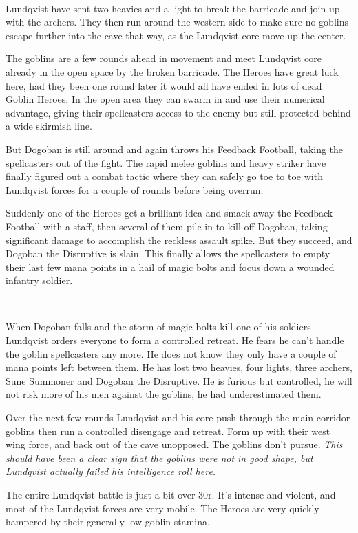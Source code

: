 \

Lundqvist have sent two heavies and a light to break the barricade and join up with the archers. They then run around the western side to make sure no goblins escape further into the cave that way, as the Lundqvist core move up the center. 

The goblins are a few rounds ahead in movement and meet Lundqvist core already in the open space by the broken barricade. The Heroes have great luck here, had they been one round later it would all have ended in lots of dead Goblin Heroes. In the open area they can swarm in and use their numerical advantage, giving their spellcasters access to the enemy but still protected behind a wide skirmish line. 

But Dogoban is still around and again throws his Feedback Football, taking the spellcasters out of the fight. The rapid melee goblins and heavy striker have finally figured out a combat tactic where they can safely go toe to toe with Lundqvist forces for a couple of rounds before being overrun.

Suddenly one of the Heroes get a brilliant idea and smack away the Feedback Football with a staff, then several of them pile in to kill off Dogoban, taking significant damage to accomplish the reckless assault spike. But they succeed, and Dogoban the Disruptive is slain. This finally allows the spellcasters to empty their last few mana points in a hail of magic bolts and focus down a wounded infantry soldier.

\

When Dogoban falls and the storm of magic bolts kill one of his soldiers Lundqvist orders everyone to form a controlled retreat. He fears he can't handle the goblin spellcasters any more. He does not know they only have a couple of mana points left between them. He has lost two heavies, four lights, three archers, Sune Summoner and Dogoban the Disruptive. He is furious but controlled, he will not risk more of his men against the goblins, he had underestimated them.

Over the next few rounds Lundqvist and his core push through the main corridor goblins then run a controlled disengage and retreat. Form up with their west wing force, and back out of the cave unopposed. The goblins don't pursue. \textit{This should have been a clear sign that the goblins were not in good shape, but Lundqvist actually failed his intelligence roll here.}

The entire Lundqvist battle is just a bit over 30r. It's intense and violent, and most of the Lundqvist forces are very mobile. The Heroes are very quickly hampered by their generally low goblin stamina.

